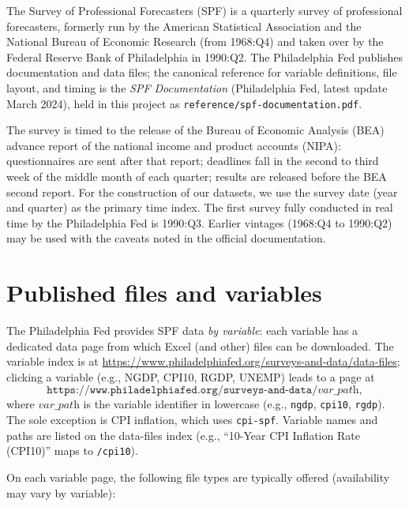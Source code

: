 \documentclass[11pt]{article}
\begin{document}
The Survey of Professional Forecasters (SPF) is a quarterly survey of
professional forecasters, formerly run by the American Statistical Association
and the National Bureau of Economic Research (from 1968:Q4) and taken over by
the Federal Reserve Bank of Philadelphia in 1990:Q2. The Philadelphia Fed
publishes documentation and data files; the canonical reference for variable
definitions, file layout, and timing is the \emph{SPF Documentation}
(Philadelphia Fed, latest update March 2024), held in this project as
\texttt{reference/spf-documentation.pdf}.

The survey is timed to the release of the Bureau of Economic Analysis (BEA)
advance report of the national income and product accounts (NIPA):
questionnaires are sent after that report; deadlines fall in the second to
third week of the middle month of each quarter; results are released before
the BEA second report. For the construction of our datasets, we use the
survey date (year and quarter) as the primary time index. The first survey
fully conducted in real time by the Philadelphia Fed is 1990:Q3. Earlier
vintages (1968:Q4 to 1990:Q2) may be used with the caveats noted in the
official documentation.

\section{Published files and variables}

The Philadelphia Fed provides SPF data \emph{by variable}: each variable has a
dedicated data page from which Excel (and other) files can be downloaded. The
variable index is at \url{https://www.philadelphiafed.org/surveys-and-data/data-files};
clicking a variable (e.g., NGDP, CPI10, RGDP, UNEMP) leads to a page at
\[
\texttt{https://www.philadelphiafed.org/surveys-and-data/}\textit{var\_path},
\]
where $\textit{var\_path}$ is the variable identifier in lowercase (e.g.,
\texttt{ngdp}, \texttt{cpi10}, \texttt{rgdp}). The sole exception is CPI
inflation, which uses \texttt{cpi-spf}. Variable names and paths are listed on
the data-files index (e.g., ``10-Year CPI Inflation Rate (CPI10)'' maps to
\texttt{/cpi10}).

On each variable page, the following file types are typically offered
(availability may vary by variable):
\end{document}
